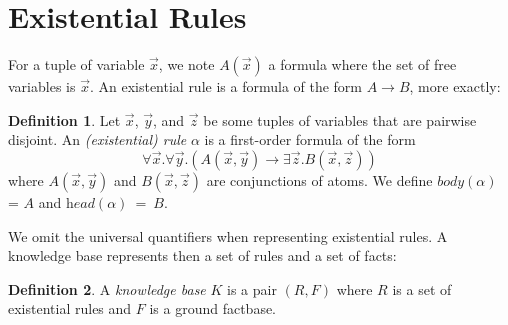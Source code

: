 \documentclass{article}
\theoremstyle{definition}
\newtheorem{definition}{Definition}[section]
\theoremstyle{remark}
\begin{document}



\section{Existential Rules}

For a tuple of variable $\vec x$, we note $A(\vec x)$ a formula where the set of free variables is $\vec x$. An existential rule is a formula of the form $A \rightarrow B$, more exactly:

\begin{definition}
Let $\vec x$, $\vec y$, and $\vec z$ be some tuples of variables that are pairwise disjoint. An \emph{(existential) rule} $\alpha$ is a first-order formula	of the form $$\forall \vec x.\forall \vec y.( A(\vec x,\vec y) \rightarrow \exists \vec z. B(\vec x,\vec z))$$ where $A(\vec x,\vec y)$ and $B(\vec x,\vec z)$ are conjunctions of atoms. We define \emph{$\textit{body}(\alpha)$} = $A$ and \emph{$\textit{head}(\alpha)$}~=~$B$.
\end{definition}
We omit the universal quantifiers when representing existential rules. A knowledge base represents then a set of rules and a set of facts:

\begin{definition}
A \emph{knowledge base} $K$ is a pair $(R,F)$ where $R$ is a set of existential rules and $F$ is a  ground factbase.
\end{definition}
\end{document}

